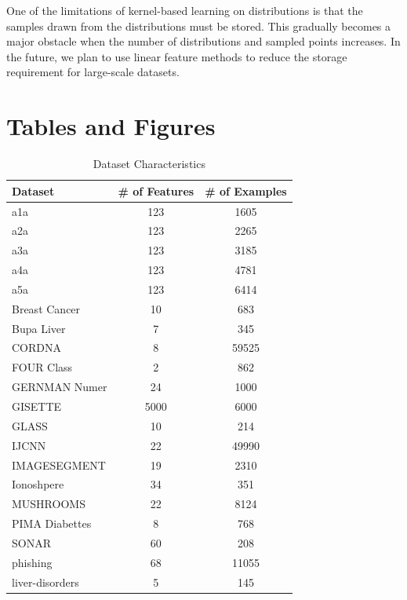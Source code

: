 \documentclass[12pt]{article}
\begin{document}
	One of the limitations of kernel-based learning on distributions is that the samples drawn from the distributions must be stored. This gradually becomes a major obstacle when the number of distributions and sampled points increases. In the future, we plan to use linear feature methods to reduce the storage requirement for large-scale datasets.
	
	\section*{Tables and Figures}
	\begin{table}[h!]
		\centering
		\caption{Dataset Characteristics}
		\label{tab:datasets}
		\begin{tabular}{l|c|c}
			\hline
			Dataset & \# of Features & \# of Examples \\
			\hline
			a1a & 123 & 1605 \\
			a2a & 123 & 2265 \\
			a3a & 123 & 3185 \\
			a4a & 123 & 4781 \\
			a5a & 123 & 6414 \\
			Breast Cancer & 10 & 683 \\
			Bupa Liver & 7 & 345 \\
			CORDNA & 8 & 59525 \\
			FOUR Class & 2 & 862 \\
			GERNMAN Numer & 24 & 1000 \\
			GISETTE & 5000 & 6000 \\
			GLASS & 10 & 214 \\
			IJCNN & 22 & 49990 \\
			IMAGESEGMENT & 19 & 2310 \\
			Ionoshpere & 34 & 351 \\
			MUSHROOMS & 22 & 8124 \\
			PIMA Diabettes & 8 & 768 \\
			SONAR & 60 & 208 \\
			phishing & 68 & 11055 \\
			liver-disorders & 5 & 145 \\
			\hline
		\end{tabular}
	\end{table}
	
\end{document}
